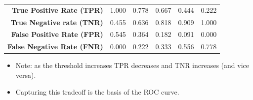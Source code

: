 \documentclass[xcolor={table}]{beamer}
\begin{document}
\begin{frame} [plain]
\begin{table}[!tb]
\begin{scriptsize}
\begin{tabular}{  c  c  c  c  c  c  c  c }
\multicolumn{3}{r}{\textbf{True Positive Rate (TPR)}}	&	1.000	&	0.778	&	0.667	&	0.444	&	0.222	\\
\multicolumn{3}{r}{\textbf{True Negative rate (TNR)}}	&	0.455	&	0.636	&	0.818	&	0.909	&	1.000	\\
\multicolumn{3}{r}{\textbf{False Positive Rate (FPR)}}	&	0.545	&	0.364	&	0.182	&	0.091	&	0.000	\\
\multicolumn{3}{r}{\textbf{False Negative Rate (FNR)}}	&	0.000	&	0.222	&	0.333	&	0.556	&	0.778	\\
\hline 
\end{tabular}
\end{scriptsize}
\end{table}
\end{frame} 

\begin{frame}
	\begin{itemize}
		\item Note: as the threshold increases TPR decreases and TNR increases (and vice versa).
		\item Capturing this tradeoff is the basis of the ROC curve.
	\end{itemize}
\end{frame}
\end{document}
